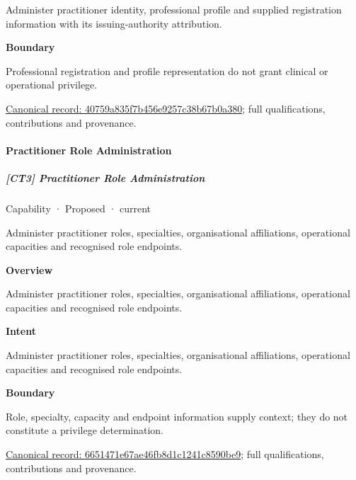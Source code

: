 Administer practitioner identity, professional profile and supplied registration information with its issuing-authority attribution.



\textbf{Boundary}



Professional registration and profile representation do not grant clinical or operational privilege.


{\footnotesize \href{../../../../continuum/strategy/capability/40759a835f7b456e9257c38b67b0a380.md}{Canonical record: 40759a835f7b456e9257c38b67b0a380}; full qualifications, contributions and provenance.}\par
\paragraph{Practitioner Role Administration}

\subparagraph{[CT3] Practitioner Role Administration}

\label{element:6651471e67ae46fb8d1c1241c8590be9}
{\small Capability · Proposed · current}\par

Administer practitioner roles, specialties, organisational affiliations, operational capacities and recognised role endpoints.



\textbf{Overview}



Administer practitioner roles, specialties, organisational affiliations, operational capacities and recognised role endpoints.



\textbf{Intent}



Administer practitioner roles, specialties, organisational affiliations, operational capacities and recognised role endpoints.



\textbf{Boundary}



Role, specialty, capacity and endpoint information supply context; they do not constitute a privilege determination.


{\footnotesize \href{../../../../continuum/strategy/capability/6651471e67ae46fb8d1c1241c8590be9.md}{Canonical record: 6651471e67ae46fb8d1c1241c8590be9}; full qualifications, contributions and provenance.}\par
